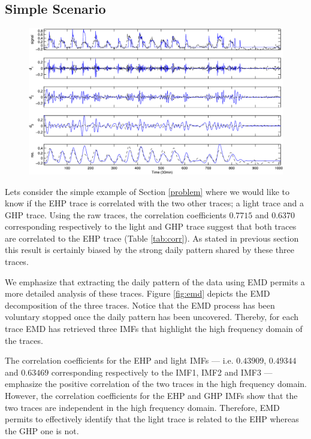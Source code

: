 \subsection{Simple Scenario}

\begin{figure}[tb]
\begin{center}
\includegraphics[width=\textwidth]{img/emd_25_41}
\caption{}
\label{fig:emd2}
\end{center}
\end{figure}

Lets consider the simple example of Section \ref{problem} where we would like to know if the EHP trace is correlated with the two other traces; a light trace and a GHP trace.
Using the raw traces, the correlation coefficients $0.7715$ and $0.6370$ corresponding respectively to the light and GHP trace suggest that both traces are correlated to the EHP trace (Table \ref{tab:corr}).
As stated in previous section this result is certainly biased by the strong daily pattern shared by these three traces.

We emphasize that extracting the daily pattern of the data using EMD permits a more detailed analysis of these traces.
Figure \ref{fig:emd} depicts the EMD decomposition of the three traces.
Notice that the EMD process has been voluntary stopped once the daily pattern has been uncovered.
Thereby, for each trace EMD has retrieved three IMFs that highlight the high frequency domain of the traces.

The correlation coefficients for the EHP and light IMFs --- i.e. $0.43909$, $0.49344$ and $0.63469$ corresponding respectively to the IMF1, IMF2 and IMF3 --- emphasize the positive correlation of the two traces in the high frequency domain.
However, the correlation coefficients for the EHP and GHP IMFs show that the two traces are independent in the high frequency domain.
Therefore, EMD permits to effectively identify that the light trace is related to the EHP whereas the GHP one is not.

